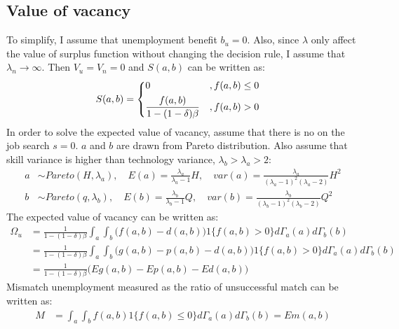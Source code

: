 \documentclass{article}
\newcommand{\1}{\mathbb{1}}
\begin{document}
\subsection{Value of vacancy}
To simplify, I assume that unemployment benefit $b_u = 0$. Also, since $\lambda$ only affect the value of surplus function without changing the decision rule, I assume that $\lambda_n \to \infty$. Then $V_u = V_n = 0$ and $S(a,b)$ can be written as: 
\begin{align*}										
S(a,b)
&= \begin{dcases}
0 & ,f(a,b) \leq 0 \\
\frac{f(a,b)}{1-(1-\delta)\beta} & ,f(a,b)>0
\end{dcases}
\end{align*}
In order to solve the expected value of vacancy, assume that there is no on the job search $s = 0$. $a$ and $b$ are drawn from Pareto distribution. Also assume that skill variance is higher than technology variance, $\lambda_b>\lambda_a>2$:
\begin{align*}
a &\sim Pareto(H,\lambda_a), \quad E(a) = \frac{\lambda_a}{\lambda_a-1}H, \quad var(a) =  \frac{\lambda_a}{(\lambda_a-1)^2(\lambda_a-2)}H^2 \\
b &\sim Pareto(q,\lambda_b), \quad E(b) = \frac{\lambda_b}{\lambda_b-1}Q, \quad var(b) =  \frac{\lambda_b}{(\lambda_b-1)^2(\lambda_b-2)}Q^2
\end{align*}
The expected value of vacancy can be written as: 
\begin{align*}
\Omega_u &= \frac{1}{1-(1-\delta)\beta}\int_a\int_b\Big(f(a,b)-d(a,b)\Big)1\{f(a,b)>0\}d\Gamma_a(a)d\Gamma_b(b) \\
				&= \frac{1}{1-(1-\delta)\beta}\int_a\int_b\Big(g(a,b)-p(a,b)-d(a,b)\Big)1\{f(a,b)>0\}d\Gamma_a(a)d\Gamma_b(b) \\
&=\frac{1}{1-(1-\delta)\beta}\Big(Eg(a,b)-Ep(a,b)-Ed(a,b)\Big)
\end{align*}
Mismatch unemployment measured as the ratio of unsuccessful match can be written as: 
\begin{align*}
M &= \int_a\int_bf(a,b)1\{f(a,b) \leq 0\}d\Gamma_a(a)d\Gamma_b(b)=Em(a,b)
\end{align*}
\end{document}
